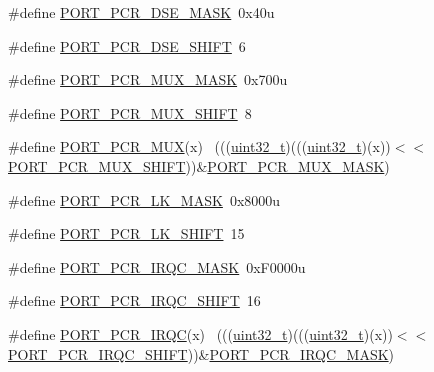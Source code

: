 \begin{DoxyCompactItemize}
\item 
\#define \hyperlink{group___p_o_r_t___register___masks_gae1c37b9f66e58bd80e7764232fd05cee}{P\+O\+R\+T\+\_\+\+P\+C\+R\+\_\+\+D\+S\+E\+\_\+\+M\+A\+SK}~0x40u
\item 
\#define \hyperlink{group___p_o_r_t___register___masks_ga00ae08038ade5432d0240666658d8867}{P\+O\+R\+T\+\_\+\+P\+C\+R\+\_\+\+D\+S\+E\+\_\+\+S\+H\+I\+FT}~6
\item 
\#define \hyperlink{group___p_o_r_t___register___masks_ga0feec5fc6b285b83c573f913c74e5c41}{P\+O\+R\+T\+\_\+\+P\+C\+R\+\_\+\+M\+U\+X\+\_\+\+M\+A\+SK}~0x700u
\item 
\#define \hyperlink{group___p_o_r_t___register___masks_gaa39e1cfed4df3797e4f1d141adab8776}{P\+O\+R\+T\+\_\+\+P\+C\+R\+\_\+\+M\+U\+X\+\_\+\+S\+H\+I\+FT}~8
\item 
\#define \hyperlink{group___p_o_r_t___register___masks_gad20ae957ec775096862e8a6542463e03}{P\+O\+R\+T\+\_\+\+P\+C\+R\+\_\+\+M\+UX}(x)                                                ~(((\hyperlink{_p_e___types_8h_a33594304e786b158f3fb30289278f5af}{uint32\+\_\+t})(((\hyperlink{_p_e___types_8h_a33594304e786b158f3fb30289278f5af}{uint32\+\_\+t})(x))$<$$<$\hyperlink{group___p_o_r_t___register___masks_gaa39e1cfed4df3797e4f1d141adab8776}{P\+O\+R\+T\+\_\+\+P\+C\+R\+\_\+\+M\+U\+X\+\_\+\+S\+H\+I\+FT}))\&\hyperlink{group___p_o_r_t___register___masks_ga0feec5fc6b285b83c573f913c74e5c41}{P\+O\+R\+T\+\_\+\+P\+C\+R\+\_\+\+M\+U\+X\+\_\+\+M\+A\+SK})
\item 
\#define \hyperlink{group___p_o_r_t___register___masks_ga671e65e4960f3b103af68881ae99d85a}{P\+O\+R\+T\+\_\+\+P\+C\+R\+\_\+\+L\+K\+\_\+\+M\+A\+SK}~0x8000u
\item 
\#define \hyperlink{group___p_o_r_t___register___masks_ga72ad78bf008f1968310a8abcd09b29ea}{P\+O\+R\+T\+\_\+\+P\+C\+R\+\_\+\+L\+K\+\_\+\+S\+H\+I\+FT}~15
\item 
\#define \hyperlink{group___p_o_r_t___register___masks_gabaef70d886fda0a7da8e862308bf5909}{P\+O\+R\+T\+\_\+\+P\+C\+R\+\_\+\+I\+R\+Q\+C\+\_\+\+M\+A\+SK}~0x\+F0000u
\item 
\#define \hyperlink{group___p_o_r_t___register___masks_ga0bda43cd85ca4d5df17f12a193937d81}{P\+O\+R\+T\+\_\+\+P\+C\+R\+\_\+\+I\+R\+Q\+C\+\_\+\+S\+H\+I\+FT}~16
\item 
\#define \hyperlink{group___p_o_r_t___register___masks_gadbd5b173d13c0766ed34cb90095ba789}{P\+O\+R\+T\+\_\+\+P\+C\+R\+\_\+\+I\+R\+QC}(x)                                              ~(((\hyperlink{_p_e___types_8h_a33594304e786b158f3fb30289278f5af}{uint32\+\_\+t})(((\hyperlink{_p_e___types_8h_a33594304e786b158f3fb30289278f5af}{uint32\+\_\+t})(x))$<$$<$\hyperlink{group___p_o_r_t___register___masks_ga0bda43cd85ca4d5df17f12a193937d81}{P\+O\+R\+T\+\_\+\+P\+C\+R\+\_\+\+I\+R\+Q\+C\+\_\+\+S\+H\+I\+FT}))\&\hyperlink{group___p_o_r_t___register___masks_gabaef70d886fda0a7da8e862308bf5909}{P\+O\+R\+T\+\_\+\+P\+C\+R\+\_\+\+I\+R\+Q\+C\+\_\+\+M\+A\+SK})

\end{DoxyCompactItemize}
